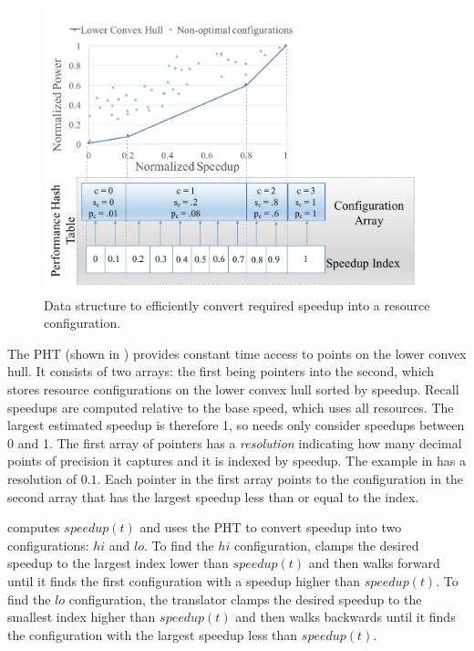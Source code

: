 \begin{figure}
\includegraphics[width=\columnwidth]{figures/performance-hash-table.pdf}
\caption{Data structure to efficiently convert required speedup into a
  resource configuration.}
  \label{fig:pht}
\end{figure}

The PHT (shown in ) provides constant time access to
points on the lower convex hull.  It consists of two arrays: the first
being pointers into the second, which stores resource configurations
on the lower convex hull sorted by speedup.  Recall speedups are
computed relative to the base speed, which uses all resources.  The
largest estimated speedup is therefore 1, so \SYSTEM{} needs only
consider speedups between 0 and 1.  The first array of pointers has a
\emph{resolution} indicating how many decimal points of precision it
captures and it is indexed by speedup.  The example in
 has a resolution of $0.1$.  Each pointer in the first
array points to the configuration in the second array that has the
largest speedup less than or equal to the index.

\SYSTEM{} computes $speedup(t)$ and uses the PHT to convert speedup
into two configurations: $hi$ and $lo$.  To find the $hi$
configuration, \SYSTEM{} clamps the desired speedup to the largest
index lower than $speedup(t)$ and then walks forward until it finds
the first configuration with a speedup higher than $speedup(t)$.  To
find the $lo$ configuration, the translator clamps the desired speedup
to the smallest index higher than $speedup(t)$ and then walks
backwards until it finds the configuration with the largest speedup
less than $speedup(t)$.

